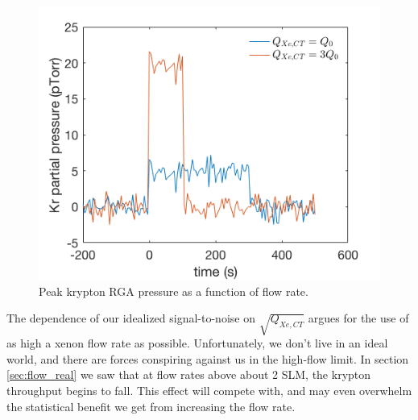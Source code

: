 \documentclass[12pt]{article}
\begin{document}
\begin{figure}[h]
  \includegraphics[width=\linewidth]{Figures/RGAtrace_ideal.png}
  \caption{Peak krypton RGA pressure as a function of flow rate.  }
  \label{fig:flowresponse1x}
\end{figure}

The dependence of our idealized signal-to-noise on $\sqrt{Q_{Xe,CT}}$ argues for the use of as high a xenon flow rate as possible. Unfortunately, we don't live in an ideal world, and there are forces conspiring against us in the high-flow limit. In section \ref{sec:flow_real} we saw that at flow rates above about 2 SLM, the krypton throughput begins to fall. This effect will compete with, and may even overwhelm the statistical benefit we get from increasing the flow rate.
\end{document}
